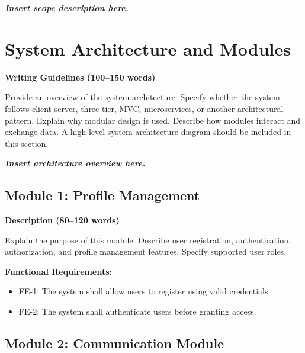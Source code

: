 \vspace{0.5cm}

\textbf{\textit{Insert scope description here.}}




\section{System Architecture and Modules}

\textbf{Writing Guidelines (100–150 words)}

Provide an overview of the system architecture. Specify whether the 
system follows client-server, three-tier, MVC, microservices, or 
another architectural pattern. Explain why modular design is used. 
Describe how modules interact and exchange data. A high-level system 
architecture diagram should be included in this section.

\vspace{0.5cm}

\textbf{\textit{Insert architecture overview here.}}




\subsection{Module 1: Profile Management}

\textbf{Description (80–120 words)}

Explain the purpose of this module. Describe user registration, 
authentication, authorization, and profile management features. 
Specify supported user roles.

\textbf{Functional Requirements:}

\begin{itemize}
    \item FE-1: The system shall allow users to register using valid credentials.
    \item FE-2: The system shall authenticate users before granting access.
\end{itemize}



\subsection{Module 2: Communication Module}

